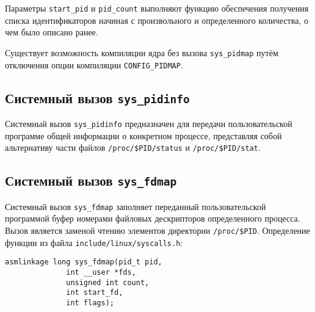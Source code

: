 Параметры \texttt{start\_pid} и \texttt{pid\_count} выполняют функцию обеспечения
получения списка идентификаторов начиная с произвольного и определенного
количества, о чем было описано ранее.

Существует возможность компиляции ядра без вызова \texttt{sys\_pidmap} путём
отключения опции компиляции \texttt{CONFIG\_PIDMAP}.

\subsection{Системный вызов \texttt{sys\_pidinfo}}

Системный вызов \texttt{sys\_pidinfo} предназначен для передачи пользовательской
программе общей информации о конкретном процессе, представляя собой альтернативу
части файлов \texttt{/proc/\$PID/status} и \texttt{/proc/\$PID/stat}.

\subsection{Системный вызов \texttt{sys\_fdmap}}

Системный вызов \texttt{sys\_fdmap} заполняет переданный пользовательской
программой буфер номерами файловых дескрипторов определенного процесса. Вызов
является заменой чтению элементов директории \texttt{/proc/\$PID}. Определение
функции из файла \texttt{include/linux/syscalls.h}:

\medskip
\begin{lstlisting}[style=cstyle]
asmlinkage long sys_fdmap(pid_t pid,
			  int __user *fds,
			  unsigned int count,
			  int start_fd,
			  int flags);
\end{lstlisting}
\medskip

